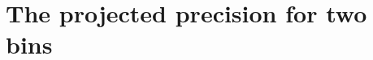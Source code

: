 %
\providecommand{\ones}{\mathbf{1}}  %
\providecommand{\Prec}{\mathsf{P}}  %
\providecommand{\Cov}{\mathsf{C}}   %
\providecommand{\T}{^{\mathsf{T}}}
\providecommand{\bstwo}{b_{s^2}}

\section{The projected precision for two bins}
\label{sec:twobins}

